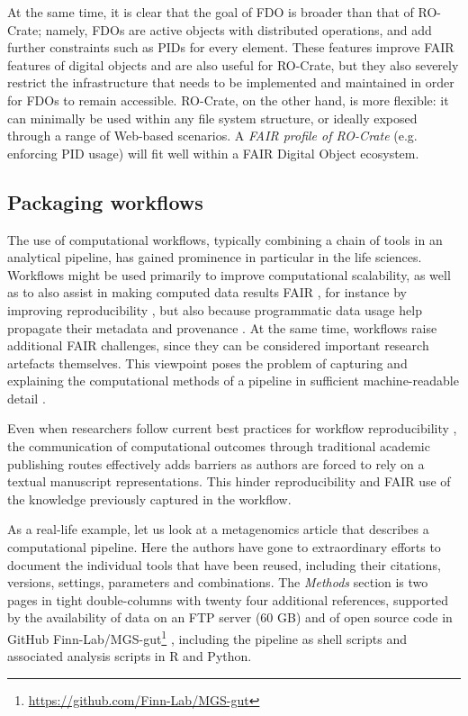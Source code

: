 \documentclass[ds,v1.1.2,openaccess]{iosart2x}%
\begin{document}
At the same time, it is clear that the goal of FDO is broader than that
of RO-Crate; namely, FDOs are active objects with distributed
operations, and add further constraints such as PIDs for every element.
These features improve FAIR features of digital objects and are also
useful for RO-Crate, but they also severely restrict the infrastructure
that needs to be implemented and maintained in order for FDOs to remain
accessible. RO-Crate, on the other hand, is more flexible: it can
minimally be used within any file system structure, or ideally exposed
through a range of Web-based scenarios. A \textit{FAIR profile of RO-Crate}
(e.g. enforcing PID usage) will fit well within a FAIR Digital Object ecosystem.

 \subsection{Packaging workflows}

The use of computational workflows, typically combining a chain of
tools in an analytical pipeline, has gained prominence in particular in
the life sciences. Workflows might be used primarily to improve
computational scalability, as well as to also assist in making computed
data results FAIR \cite{doi:10.1162/dint_a_00033}, for instance by
improving reproducibility \cite{doi:10.1016/j.future.2017.01.012}, but also
because programmatic data usage help propagate their metadata and
provenance \cite{doi:10.1002/cpe.1228}. At the same time, workflows raise
additional FAIR challenges, since they can be considered important
research artefacts themselves. This viewpoint poses the problem of
capturing and explaining the computational methods of a pipeline in
sufficient machine-readable detail \cite{doi:10.3233/DS-190026}.

Even when researchers follow current best practices for workflow
reproducibility \cite{doi:10.1016/j.cels.2018.03.014,doi:10.1016/j.future.2017.01.012}, the communication of computational
outcomes through traditional academic publishing routes effectively
adds barriers as authors are forced to rely on a textual manuscript
representations. This hinder reproducibility and FAIR use of the
knowledge previously captured in the workflow.

As a real-life example, let us look at a metagenomics article
\cite{doi:10.1038/s41586-019-0965-1} that describes a computational
pipeline. Here the authors have gone to extraordinary efforts to
document the individual tools that have been reused, including their
citations, versions, settings, parameters and combinations. The
\textit{Methods} section is two pages in tight double-columns with twenty four
additional references, supported by the availability of data on an FTP
server (60 GB) \cite{ebi_ftp_umgs2019} and of open source code in GitHub
Finn-Lab/MGS-gut\footnote{\url{https://github.com/Finn-Lab/MGS-gut}}
\cite{finn-lab-mgsgut}, including the pipeline as shell scripts and
associated analysis scripts in R and Python.
\end{document}
